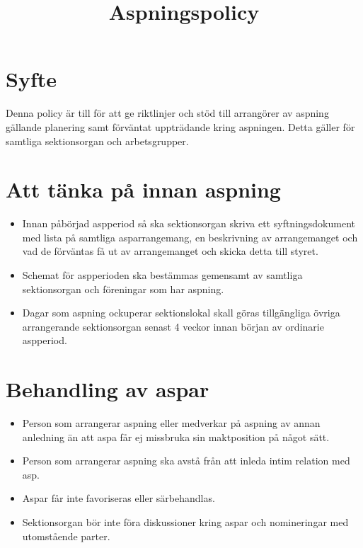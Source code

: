 \documentclass[11pt, includeaddress]{classes/cthit}
\begin{document}
\title{Aspningspolicy}
\maketitle

\thispagestyle{empty}

\newpage

\makeheadfoot%

\setcounter{tocdepth}{2}
\setcounter{page}{1}
\tableofcontents

\newpage

\section{Syfte}
Denna policy är till för att ge riktlinjer och stöd till arrangörer av aspning gällande planering samt förväntat uppträdande kring aspningen. 
Detta gäller för samtliga sektionsorgan och arbetsgrupper.


\section{Att tänka på innan aspning}
\begin{itemize}
  \item Innan påbörjad aspperiod så ska sektionsorgan skriva ett syftningsdokument med lista på samtliga asparrangemang, en beskrivning av arrangemanget och vad de förväntas få ut av arrangemanget och skicka detta till styret.
  \item Schemat för aspperioden ska bestämmas gemensamt av samtliga sektionsorgan och föreningar som har aspning.
  \item Dagar som aspning ockuperar sektionslokal skall göras tillgängliga övriga arrangerande sektionsorgan senast 4 veckor innan början av ordinarie aspperiod.
\end{itemize}

\section{Behandling av aspar}
\begin{itemize}
  \item Person som arrangerar aspning eller medverkar på aspning av annan anledning än att aspa får ej missbruka sin maktposition på något sätt.
  \item Person som arrangerar aspning ska avstå från att inleda intim relation med asp.
  \item Aspar får inte favoriseras eller särbehandlas.
  \item Sektionsorgan bör inte föra diskussioner kring aspar och nomineringar med utomstående parter.
\end{itemize}
\end{document}
